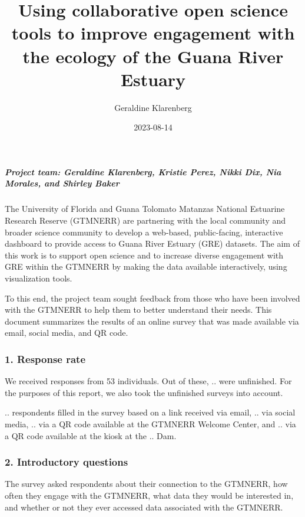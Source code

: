 \documentclass[
]{article}
\title{Using collaborative open science tools to improve engagement with
the ecology of the Guana River Estuary}
\author{Geraldine Klarenberg}
\date{2023-08-14}
\begin{document}
\maketitle

\hypertarget{project-team-geraldine-klarenberg-kristie-perez-nikki-dix-nia-morales-and-shirley-baker}{%
\subparagraph{\texorpdfstring{\emph{Project team: Geraldine Klarenberg,
Kristie Perez, Nikki Dix, Nia Morales, and Shirley
Baker}}{Project team: Geraldine Klarenberg, Kristie Perez, Nikki Dix, Nia Morales, and Shirley Baker}}\label{project-team-geraldine-klarenberg-kristie-perez-nikki-dix-nia-morales-and-shirley-baker}}

The University of Florida and Guana Tolomato Matanzas National Estuarine
Research Reserve (GTMNERR) are partnering with the local community and
broader science community to develop a web-based, public-facing,
interactive dashboard to provide access to Guana River Estuary (GRE)
datasets. The aim of this work is to support open science and to
increase diverse engagement with GRE within the GTMNERR by making the
data available interactively, using visualization tools.

To this end, the project team sought feedback from those who have been
involved with the GTMNERR to help them to better understand their needs.
This document summarizes the results of an online survey that was made
available via email, social media, and QR code.

\hypertarget{response-rate}{%
\subsubsection{1. Response rate}\label{response-rate}}

We received responses from 53 individuals. Out of these, .. were
unfinished. For the purposes of this report, we also took the unfinished
surveys into account.

.. respondents filled in the survey based on a link received via email,
.. via social media, .. via a QR code available at the GTMNERR Welcome
Center, and .. via a QR code available at the kiosk at the .. Dam.

\hypertarget{introductory-questions}{%
\subsubsection{2. Introductory questions}\label{introductory-questions}}

The survey asked respondents about their connection to the GTMNERR, how
often they engage with the GTMNERR, what data they would be interested
in, and whether or not they ever accessed data associated with the
GTMNERR.
\end{document}

